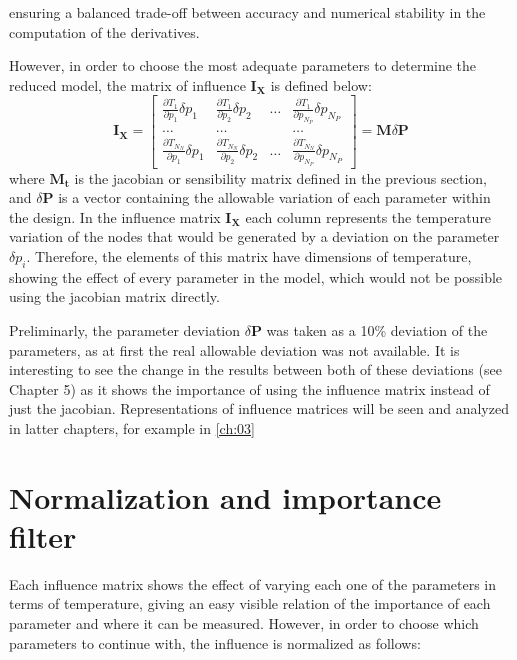  ensuring a balanced trade-off between accuracy and numerical stability in the computation of the derivatives.

However, in order to choose the most adequate parameters to determine the reduced model, the matrix of influence $\mathbf{I}_{\mathbf{X}}$ is defined below:
\begin{equation}
\mathbf{I}_{\mathbf{X}}=\left[\begin{array}{cccc}
\frac{\partial T_1}{\partial p_1} \delta p_1 & \frac{\partial T_1}{\partial p_2} \delta p_2 & \ldots & \frac{\partial T_1}{\partial p_{N_P}} \delta p_{N_P} \\
\ldots & \ldots & & \ldots \\
\frac{\partial T_{N_N}}{\partial p_1} \delta p_1 & \frac{\partial T_{N_N}}{\partial p_2} \delta p_2 & \ldots & \frac{\partial T_{N_N}}{\partial p_{N_P}} \delta p_{N_P}
\end{array}\right]=\mathbf{M} \delta \boldsymbol{P}
\end{equation}
where $\mathbf{M_t}$ is the jacobian or sensibility matrix defined in the previous section, and $ \delta \boldsymbol{P}$ is a vector containing the allowable variation of each parameter within the design. In the influence matrix $\mathbf{I}_{\mathbf{X}}$ each column represents the temperature variation of the nodes that would be generated by a deviation on the parameter $ \delta p_i$. Therefore, the elements of this matrix have dimensions of temperature, showing the effect of every parameter in the model, which would not be possible using the jacobian matrix directly.

Preliminarly,  the parameter deviation $ \delta \boldsymbol{P}$ was taken as a 10\% deviation of the parameters, as at first the real allowable deviation was not available. It is interesting to see the change in the results between both of these deviations (see Chapter 5) as it shows the importance of using the influence matrix instead of just the jacobian. Representations of influence matrices will be seen and analyzed in latter chapters, for example in \autoref{ch:03}

\section{Normalization and importance filter}\label{s:infmat}
Each influence matrix shows the effect of varying each one of the parameters in terms of temperature, giving an easy visible relation of the importance of each parameter and where it can be measured. However, in order to choose which parameters to continue with, the influence is normalized as follows:


